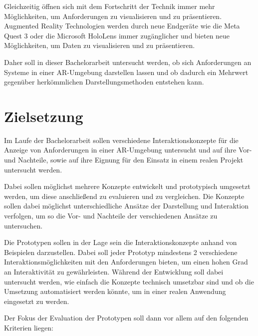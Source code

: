 Gleichzeitig öffnen sich mit dem Fortschritt der Technik immer mehr Möglichkeiten, um Anforderungen zu visualisieren und zu präsentieren.
Augmented Reality Technologien werden durch neue Endgeräte wie die Meta Quest 3 oder die Microsoft HoloLens immer zugänglicher und bieten neue Möglichkeiten, um Daten zu visualisieren und zu präsentieren.

Daher soll in dieser Bachelorarbeit untersucht werden, ob sich Anforderungen an Systeme in einer AR-Umgebung darstellen lassen und ob dadurch ein Mehrwert gegenüber herkömmlichen Darstellungsmethoden entstehen kann.


\section{Zielsetzung}

Im Laufe der Bachelorarbeit sollen verschiedene Interaktionskonzepte für die Anzeige von Anforderungen in einer AR-Umgebung untersucht und auf ihre Vor- und Nachteile, sowie auf ihre Eignung für den Einsatz in einem realen Projekt untersucht werden.

Dabei sollen möglichst mehrere Konzepte entwickelt und prototypisch umgesetzt werden, um diese anschließend zu evaluieren und zu vergleichen.
Die Konzepte sollen dabei möglichst unterschiedliche Ansätze der Darstellung und Interaktion verfolgen, um so die Vor- und Nachteile der verschiedenen Ansätze zu untersuchen.

Die Prototypen sollen in der Lage sein die Interaktionskonzepte anhand von Beispielen darzustellen.
Dabei soll jeder Prototyp mindestens 2 verschiedene Interaktionsmöglichkeiten mit den Anforderungen bieten, um einen hohen Grad an Interaktivität zu gewährleisten.
Während der Entwicklung soll dabei untersucht werden, wie einfach die Konzepte technisch umsetzbar sind und ob die Umsetzung automatisiert werden könnte, um in einer realen Anwendung eingesetzt zu werden.

Der Fokus der Evaluation der Prototypen soll dann vor allem auf den folgenden Kriterien liegen:

